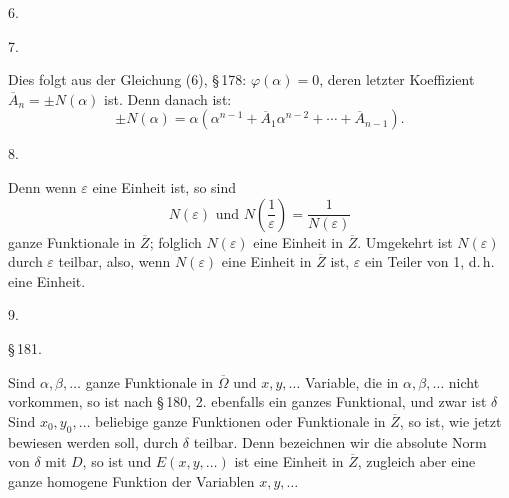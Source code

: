 6. 

7. 

Dies folgt aus der Gleichung (6), \S\,178: $\varphi(\alpha)=0$, deren letzter Koeffizient $\overline{A}_n=\pm N(\alpha)$ ist. Denn danach ist:
\[
\pm N(\alpha) = \alpha(\alpha^{n-1}+\overline{A}_1\alpha^{n-2}+\cdots+\overline{A}_{n-1}).
\]

8. 

Denn wenn $\varepsilon$ eine Einheit ist, so sind
\[
N(\varepsilon) \text{ und } N\left(\frac{1}{\varepsilon}\right) = \frac{1}{N(\varepsilon)}
\]
ganze Funktionale in $\overline{Z}$; folglich $N(\varepsilon)$ eine Einheit in $\overline{Z}$. Umgekehrt ist $N(\varepsilon)$ durch $\varepsilon$ teilbar, also, wenn $N(\varepsilon)$ eine Einheit in $\overline{Z}$ ist, $\varepsilon$ ein Teiler von 1, d.\,h. eine Einheit.

9. 

\begin{center}
\S\,181. 
\end{center}

Sind $\alpha, \beta, \ldots$ ganze Funktionale in $\overline{\Omega}$ und $x, y, \ldots$ Variable, die in $\alpha, \beta, \ldots$ nicht vorkommen, so ist
nach \S\,180, 2. ebenfalls ein ganzes Funktional, und zwar ist $\delta$  Sind $x_0, y_0, \ldots$ beliebige ganze Funktionen oder Funktionale in $\overline{Z}$, so ist, wie jetzt bewiesen werden soll,
durch $\delta$ teilbar. Denn bezeichnen wir die absolute Norm von $\delta$ mit $D$, so ist
und $E(x, y, \ldots)$ ist eine Einheit in $\overline{Z}$, zugleich aber eine ganze homogene Funktion der Variablen $x, y, \ldots$
